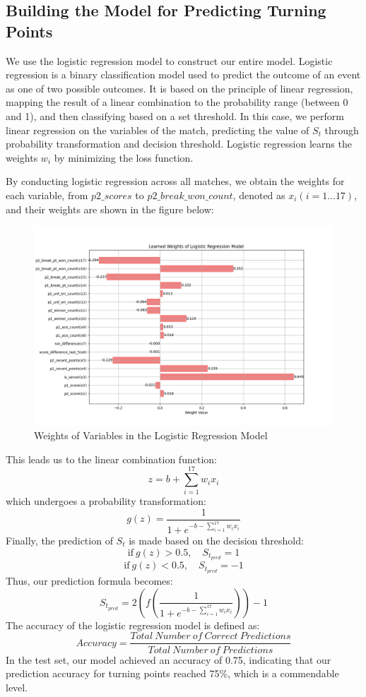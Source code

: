 \documentclass[UTF8]{ctexart} %
\begin{document}
\subsection{\textbf{Building the Model for Predicting Turning Points}}
We use the logistic regression model to construct our entire model. Logistic regression is a binary classification 
model used to predict the outcome of an event as one of two possible outcomes. It is based on the principle of 
linear regression, mapping the result of a linear combination to the probability range (between 0 and 1), and then 
classifying based on a set threshold. In this case, we perform linear regression on the variables of the match, 
predicting the value of \(S_t\) through probability transformation and decision threshold. Logistic regression 
learns the weights \(w_i\) by minimizing the loss function.

By conducting logistic regression across all matches, we obtain the weights for each variable, from \(p2\_scores\) to \(p2\_break\_won\_count\), denoted as \(x_i (i=1…17)\), and their weights are shown in the figure below:

\begin{figure}[H]
    \centering
    \includegraphics[width=\textwidth]{./graph/weights.png}
    \caption{Weights of Variables in the Logistic Regression Model}
\end{figure}

This leads us to the linear combination function:
\[z = b + \sum_{i=1}^{17}w_ix_i\]
which undergoes a probability transformation:
\[g(z) = \frac{1}{1 + e^{-b - \sum_{i=1}^{17}w_ix_i}}\]
Finally, the prediction of \(S_t\) is made based on the decision threshold:
\[ \text{if}\ g(z) > 0.5, \quad S_{t_{pred}} = 1 \]
\[ \text{if}\ g(z) < 0.5, \quad S_{t_{pred}} = -1 \]
Thus, our prediction formula becomes:
\[S_{t_{pred}} = 2\left(f\left(\frac{1}{1 + e^{-b - \sum_{i=1}^{17}w_ix_i}}\right)\right) - 1\]
The accuracy of the logistic regression model is defined as:
\[Accuracy = \frac{Total\ Number\ of\ Correct\ Predictions}{Total\ Number\ of\ Predictions}\]
In the test set, our model achieved an accuracy of 0.75, indicating that our prediction accuracy for turning 
points reached 75\%, which is a commendable level.
\end{document}
